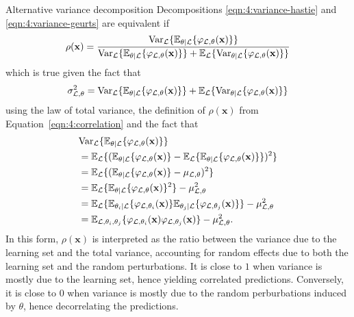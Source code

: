 \begin{remark}{Alternative variance decomposition}
Decompositions \ref{eqn:4:variance-hastie} and \ref{eqn:4:variance-geurts} are equivalent if
\begin{equation}
\rho(\mathbf{x}) = \frac{\text{Var}_{\cal L} \{ \mathbb{E}_{\theta|{\cal L}} \{ \varphi_{{\cal L},\theta}(\mathbf{x}) \} \}}{\text{Var}_{\cal L} \{ \mathbb{E}_{\theta|{\cal L}} \{ \varphi_{{\cal L},\theta}(\mathbf{x}) \} \} + \mathbb{E}_{\cal L} \{ \text{Var}_{\theta|{\cal L}} \{ \varphi_{{\cal L},\theta}(\mathbf{x}) \} \}}
\end{equation}
which is true given the fact that
\begin{equation}
\sigma^2_{{\cal L},\theta} = \text{Var}_{\cal L} \{ \mathbb{E}_{\theta|{\cal L}} \{ \varphi_{{\cal L},\theta}(\mathbf{x}) \} \} + \mathbb{E}_{\cal L} \{ \text{Var}_{\theta|{\cal L}} \{ \varphi_{{\cal L},\theta}(\mathbf{x}) \} \}
\end{equation} using the law of total variance, the definition of $\rho(\mathbf{x})$ from Equation~\ref{eqn:4:correlation} and the fact that
\begin{align}
& \text{Var}_{\cal L} \{ \mathbb{E}_{\theta|{\cal L}} \{ \varphi_{{\cal L},\theta}(\mathbf{x}) \} \} \nonumber \\
&= \mathbb{E}_{\cal L} \{ (\mathbb{E}_{\theta|{\cal L}} \{ \varphi_{{\cal L},\theta}(\mathbf{x}) \} - \mathbb{E}_{\cal L} \{ \mathbb{E}_{\theta|{\cal L}} \{ \varphi_{{\cal L},\theta}(\mathbf{x})\} \})^2 \} \nonumber \\
&= \mathbb{E}_{\cal L} \{ (\mathbb{E}_{\theta|{\cal L}} \{ \varphi_{{\cal L},\theta}(\mathbf{x}) \} - \mu_{{\cal L},\theta})^2 \} \nonumber \\
&= \mathbb{E}_{\cal L} \{ \mathbb{E}_{\theta|{\cal L}} \{ \varphi_{{\cal L},\theta}(\mathbf{x}) \}^2 \} - \mu^2_{{\cal L},\theta} \nonumber \\
&= \mathbb{E}_{\cal L} \{ \mathbb{E}_{\theta_i|{\cal L}} \{ \varphi_{{\cal L},\theta_i}(\mathbf{x}) \} \mathbb{E}_{\theta_j|{\cal L}} \{ \varphi_{{\cal L},\theta_j}(\mathbf{x}) \} \} - \mu^2_{{\cal L},\theta} \nonumber \\
&= \mathbb{E}_{{\cal L},\theta_i,\theta_j} \{ \varphi_{{\cal L},\theta_i}(\mathbf{x}) \varphi_{{\cal L},\theta_j}(\mathbf{x}) \} - \mu^2_{{\cal L},\theta}.
\end{align}
In this form, $\rho(\mathbf{x})$ is interpreted as the ratio between the variance
due to the learning set  and the total variance, accounting for
random effects due to both the learning set and the random perturbations.
It is close to $1$ when variance is mostly due to the learning set, hence
yielding correlated predictions. Conversely, it is close to $0$ when variance
is mostly due to the random perburbations induced by $\theta$, hence decorrelating
the predictions.
\end{remark}

